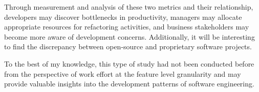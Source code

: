\documentclass{mprop}
\begin{document}
Through measurement and analysis of these two metrics and their relationship,
developers may discover bottlenecks in productivity, managers may allocate
appropriate resources for refactoring activities, and business stakeholders may
become more aware of development concerns. Additionally, it will be interesting
to find the discrepancy between open-source and proprietary software projects.

To the best of my knowledge, this type of study had not been conducted before
from the perspective of work effort at the feature level granularity and may
provide valuable insights into the development patterns of software engineering.

\pagebreak


\end{document}
